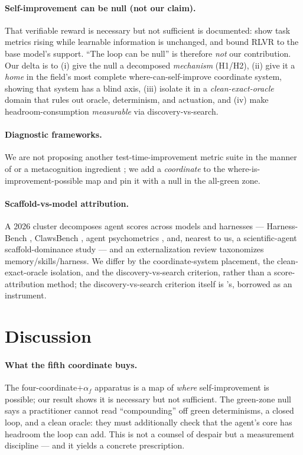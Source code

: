 \documentclass[11pt]{article}
\newcommand{\af}{\alpha_f}
\begin{document}
\paragraph{Self-improvement can be null (not our claim).} That verifiable reward is necessary but not
sufficient is documented: \citet{learnablegain2026} show task metrics rising while learnable information
is unchanged, and \citet{yue2025rlvr,wu2025leash} bound RLVR to the base model's support. ``The loop can
be null'' is therefore \emph{not} our contribution. Our delta is to (i) give the null a decomposed
\emph{mechanism} (H1/H2), (ii) give it a \emph{home} in the field's most complete
where-can-self-improve coordinate system, showing that system has a blind axis, (iii) isolate it in a
\emph{clean-exact-oracle} domain that rules out oracle, determinism, and actuation, and (iv) make
headroom-consumption \emph{measurable} via discovery-vs-search.

\paragraph{Diagnostic frameworks.} We are not proposing another test-time-improvement metric suite in
the manner of \citet{tide2026} or a metacognition ingredient \citep{metacognitive2025}; we add a
\emph{coordinate} to the where-is-improvement-possible map and pin it with a null in the all-green zone.

\paragraph{Scaffold-vs-model attribution.} A 2026 cluster decomposes agent scores across models and
harnesses --- Harness-Bench \citep{harnessbench2026}, ClawsBench \citep{clawsbench2026}, agent
psychometrics \citep{psychometrics2026}, and, nearest to us, a scientific-agent scaffold-dominance study
\citep{aiscientists2026} --- and an externalization review \citep{externalization2026} taxonomizes
memory/skills/harness. We differ by the coordinate-system placement, the clean-exact-oracle isolation,
and the discovery-vs-search criterion, rather than a score-attribution method; the discovery-vs-search
criterion itself is \citet{wangbuehler2026}'s, borrowed as an instrument.

\section{Discussion}\label{sec:discussion}
\paragraph{What the fifth coordinate buys.} The four-coordinate$+\af$ apparatus is a map of \emph{where}
self-improvement is possible; our result shows it is necessary but not sufficient. The green-zone null
says a practitioner cannot read ``compounding'' off green determinisms, a closed loop, and a clean
oracle: they must additionally check that the agent's core has headroom the loop can add. This is not a
counsel of despair but a measurement discipline --- and it yields a concrete prescription.
\end{document}
